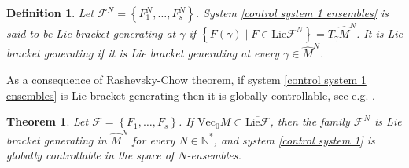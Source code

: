 \documentclass[10pt]{article}
\newcommand{\N}{{\mathbb N}}
\newcommand{\F}{\mathcal F}
\newcommand{\ov}{\overline}
\newtheorem{theorem}{Theorem}
\newtheorem{definition}{Definition}
\begin{document}
\begin{definition}
    Let $\F^N=\left\{F_1^N,\dots,F^N_s\right\}$. System \eqref{control system 1 ensembles} is said to be Lie bracket generating at $\gamma$ if $\left\{F(\gamma)\mid F\in \mathrm{Lie}\F^N\right\}=T_{\gamma}\hat{M}^N$. It is Lie bracket generating if it is Lie bracket generating at every $\gamma \in \hat{M}^N$.
\end{definition}

As a consequence of Rashevsky-Chow theorem, if system \eqref{control system 1 ensembles} is Lie bracket generating then it is globally controllable, see e.g. \cite[Th.~5.2 and Cor~5.2]{AgSa}.

\begin{theorem} \label{theorem : controllability ensembles}
    Let $\F=\left\{F_1,\dots,F_s\right\}$. If $\mathrm{Vec}_0M\subset \ov{\mathrm{Lie}\F}$, then the family $\F^N$ is Lie bracket generating in $\hat{M}^N$ for every $N\in \N^*$, and system \eqref{control system 1} is globally controllable in the space of $N$-ensembles.
\end{theorem}
\end{document}
